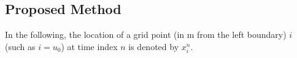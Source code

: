 
\subsection{Proposed Method}\label{sec:proposedMethod}
In the following, the location of a grid point (in m from the left boundary) $i$ (such as $i = u_0$) at time index $n$ is denoted by $x_i^n$. 

